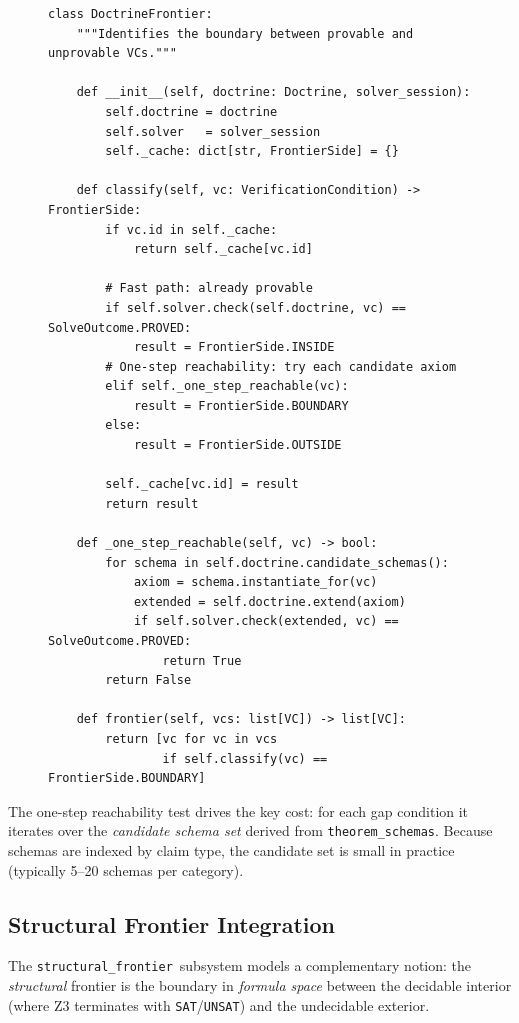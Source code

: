 \documentclass[11pt]{article}
\newcommand{\SFpkg}{\texttt{structural\_frontier}}
\newcommand{\TSpkg}{\texttt{theorem\_schemas}}
\begin{document}
\begin{figure}[H]
\begin{lstlisting}[style=jugeo-python, caption={DoctrineFrontier.detect (simplified)},
                   label=alg:frontier]
class DoctrineFrontier:
    """Identifies the boundary between provable and unprovable VCs."""

    def __init__(self, doctrine: Doctrine, solver_session):
        self.doctrine = doctrine
        self.solver   = solver_session
        self._cache: dict[str, FrontierSide] = {}

    def classify(self, vc: VerificationCondition) -> FrontierSide:
        if vc.id in self._cache:
            return self._cache[vc.id]

        # Fast path: already provable
        if self.solver.check(self.doctrine, vc) == SolveOutcome.PROVED:
            result = FrontierSide.INSIDE
        # One-step reachability: try each candidate axiom
        elif self._one_step_reachable(vc):
            result = FrontierSide.BOUNDARY
        else:
            result = FrontierSide.OUTSIDE

        self._cache[vc.id] = result
        return result

    def _one_step_reachable(self, vc) -> bool:
        for schema in self.doctrine.candidate_schemas():
            axiom = schema.instantiate_for(vc)
            extended = self.doctrine.extend(axiom)
            if self.solver.check(extended, vc) == SolveOutcome.PROVED:
                return True
        return False

    def frontier(self, vcs: list[VC]) -> list[VC]:
        return [vc for vc in vcs
                if self.classify(vc) == FrontierSide.BOUNDARY]
\end{lstlisting}
\end{figure}

The one-step reachability test drives the key cost: for each gap
condition it iterates over the \emph{candidate schema set} derived from
\TSpkg.  Because schemas are indexed by claim type, the candidate set
is small in practice (typically 5--20 schemas per category).

\subsection{Structural Frontier Integration}

The \SFpkg\ subsystem models a complementary notion: the
\emph{structural} frontier is the boundary in \emph{formula space}
between the decidable interior (where Z3 terminates with
\texttt{SAT}/\texttt{UNSAT}) and the undecidable exterior.
\end{document}
